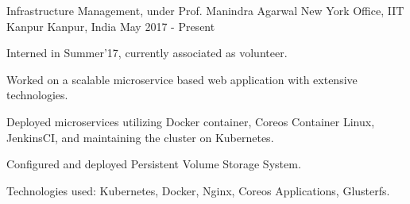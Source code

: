 

\begin{cventries}

  \cventry
    {Infrastructure Management, under Prof. Manindra Agarwal} %
    {New York Office, IIT Kanpur} %
    {Kanpur, India} %
    {May 2017 - Present} %
    {
      \begin{cvitems} %
        \item {Interned in Summer'17, currently associated as volunteer.}
        \item {Worked on a scalable microservice based web application with extensive technologies.}
        \item {Deployed microservices utilizing Docker container, Coreos Container Linux, JenkinsCI, and maintaining the cluster on Kubernetes.}
        \item {Configured and deployed Persistent Volume Storage System.}
        \item {Technologies used: Kubernetes, Docker, Nginx, Coreos Applications, Glusterfs.}
      \end{cvitems}
    }

\end{cventries}
